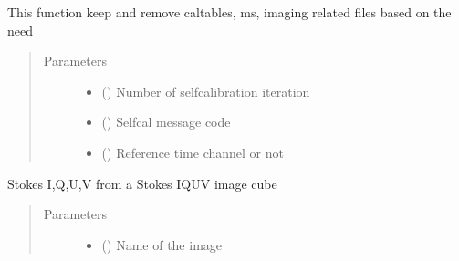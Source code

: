 \documentclass[letterpaper,10pt,english]{sphinxmanual}
\begin{document}
\begin{fulllineitems}
\begin{fulllineitems}
\label{\detokenize{paircars:paircars.fullpol_selfcal_LTS.PolSelfcal.file_remover_and_keeper}}
\sphinxAtStartPar
This function keep and remove caltables, ms, imaging related files based on the need
\begin{quote}\begin{description}
\item[{Parameters}] \leavevmode\begin{itemize}
\item {} 
\sphinxAtStartPar
{} () \textendash{} Number of self\sphinxhyphen{}calibration iteration

\item {} 
\sphinxAtStartPar
{} () \textendash{} Selfcal message code

\item {} 
\sphinxAtStartPar
{} () \textendash{} Reference time channel or not

\end{itemize}

\end{description}\end{quote}

\end{fulllineitems}


\begin{fulllineitems}
\label{\detokenize{paircars:paircars.fullpol_selfcal_LTS.PolSelfcal.get_IQUV}}
\sphinxAtStartPar
Stokes I,Q,U,V from a Stokes IQUV image cube
\begin{quote}\begin{description}
\item[{Parameters}] \leavevmode\begin{itemize}
\item {} 
\sphinxAtStartPar
{} () \textendash{} Name of the image


\end{itemize}
\end{description}
\end{quote}
\end{fulllineitems}
\end{fulllineitems}
\end{document}
